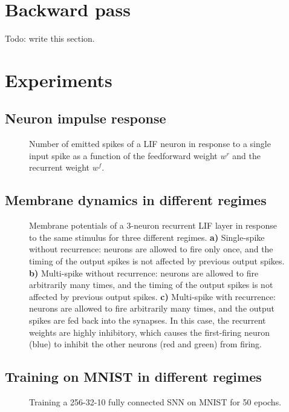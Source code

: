 \documentclass[12pt]{article}
\begin{document}
\section{Backward pass}
Todo: write this section.
\newpage

\section{Experiments}

\subsection{Neuron impulse response}
\begin{figure}[H]
  \centering
  \graphicspath{{../visualizations/single-neuron-impulse-response/report}}
  
  \caption{Number of emitted spikes of a LIF neuron in response to a single input spike as a function of the feedforward weight $w^r$ and the recurrent weight $w^f$.}
  \label{impulse-response-figure}
\end{figure}

\subsection{Membrane dynamics in different regimes}
\begin{figure}[H]
  \centering
  
  \caption{Membrane potentials of a 3-neuron recurrent LIF layer in response to the same stimulus for three different regimes. \textbf{a)} Single-spike without recurrence: neurons are allowed to fire only once, and the timing of the output spikes is not affected by previous output spikes. \textbf{b)} Multi-spike without recurrence: neurons are allowed to fire arbitrarily many times, and the timing of the output spikes is not affected by previous output spikes. %
    \textbf{c)} Multi-spike with recurrence: neurons are allowed to fire arbitrarily many times, and the output spikes are fed back into the synapses. In this case, the recurrent weights are highly inhibitory, which causes the first-firing neuron (blue) to inhibit the other neurons (red and green) from firing.}
  \label{regime-comparison-figure}
\end{figure}

\subsection{Training on MNIST in different regimes}
\begin{figure}[H]
  \centering
  
  \caption{Training a 256-32-10 fully connected SNN on MNIST for 50 epochs.}
  \label{training-comparison-figure}
\end{figure}
\end{document}
